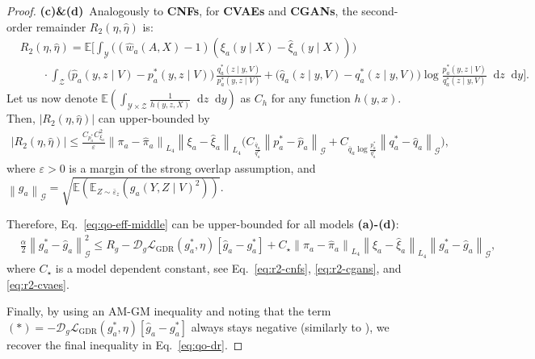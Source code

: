 \documentclass[dvipsnames]{article} %
\newcommand*\diff{\mathop{}\!\mathrm{d}}
\newcommand{\abs}[1]{\left\lvert #1 \right\rvert}
\newcommand{\norm}[1]{\left\lVert#1\right\rVert}
\begin{document}
\begin{proof}
    \textbf{(c)\&(d)}~Analogously to \textbf{CNFs}, for \textbf{CVAEs} and \textbf{CGANs}, the second-order remainder $R_2(\eta, \hat{\eta})$ is:
    \begingroup\makeatletter\def\f@size{8}\check@mathfonts
    \begin{align}
        & R_2(\eta, \hat{\eta}) = \mathbb{E} \bigg[ \int_{\mathcal{Y}} \Big((\hat{w}_a(A, X) - 1)(\xi_a(y \mid X) - \hat{\xi}_a(y \mid X))\Big) \\
        & \quad \quad \cdot \int_{\mathcal{Z}} \big( \hat{p}_a(y, z \mid V) - p_a^*(y, z \mid V)\big) \, \frac{q_a^*(z \mid y, V)}{p_a^*(y, z \mid V)} + \big( \hat{q}_a(z \mid y, V) - q_a^*(z \mid y, V) \big) \log \frac{p_a^*(y, z \mid V)}{q_a^*(z \mid y, V)} \diff z\diff y \bigg]. \nonumber
    \end{align}
    \endgroup
    Let us now denote $\mathbb{E}(\int_{\mathcal{Y} \times \mathcal{Z}}\frac{1}{h(y, z, X)} \diff z \diff y)$ as $C_{h}$ for any function $h(y, x)$. Then, $\abs{R_2(\eta, \hat{\eta})}$ can upper-bounded by 
    \begingroup\makeatletter\def\f@size{9}\check@mathfonts
    \begin{align} \label{eq:r2-cvaes}
        \abs{R_2(\eta, \hat{\eta})} \le \frac{C_{p_a^*} C_{\xi_a}^2}{\varepsilon} \norm{\pi_a - \hat{\pi}_a}_{L_4} \norm{\xi_a - \hat{\xi}_a}_{L_4} \big(C_{\frac{\bar{q}_a}{q_a^*}}\norm{p_a^* - \hat{p}_a}_{\mathcal{G}} + C_{\bar{q}_a \log \frac{p_a^*}{q_a^*} } \norm{q_a^* - \hat{q}_a}_{\mathcal{G}}\big),
    \end{align}
    \endgroup
    where $\varepsilon > 0$ is a margin of the strong overlap assumption, and $\norm{g_a}_{\mathcal{G}} = \sqrt{\mathbb{E}({\mathbb{E}_{Z \sim \bar{\varepsilon}_z}}(g_a(Y, Z \mid V)^2))}$.

    Therefore, Eq.~\eqref{eq:qo-eff-middle} can be upper-bounded for all models \textbf{(a)-(d)}:
    \begingroup\makeatletter\def\f@size{9}\check@mathfonts
    \begin{align}
        & \frac{\alpha}{2} \norm{g^*_a - \hat{g}_a}^2_\mathcal{G} \le R_g  -\mathcal{D}_g\mathcal{L}_\text{{GDR}}({g}_a^*, \eta)[\hat{g}_a - g_a^*]  +  C_{\star} \norm{\pi_a - \hat{\pi}_a}_{L_4} \norm{\xi_a - \hat{\xi}_a}_{L_4} \norm{g_a^* - \hat{g}_a}_{\mathcal{G}},
    \end{align}
    \endgroup
    where $C_\star$ is a model dependent constant, see Eq.~\eqref{eq:r2-cnfs}, \eqref{eq:r2-cgans}, and \eqref{eq:r2-cvaes}.
    
    Finally, by using an AM-GM inequality and noting that the term $(*) = -\mathcal{D}_g\mathcal{L}_\text{{GDR}}({g}_a^*, \eta)[\hat{g}_a - g_a^*]$ always stays negative (similarly to \citep{morzywolek2023general}), we recover the final inequality in Eq.~\eqref{eq:qo-dr}.
    
    
\end{proof}
\end{document}
